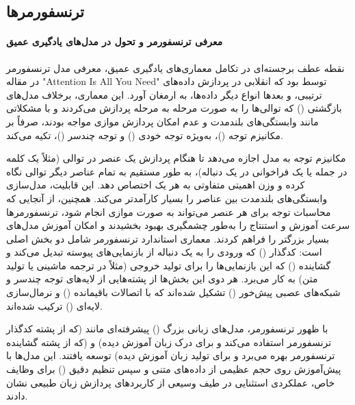 \subsection{ترنسفورمرها}

\paragraph{معرفی ترنسفورمر و تحول در مدل‌های یادگیری عمیق}
نقطه عطف برجسته‌ای در تکامل معماری‌های یادگیری عمیق، معرفی مدل ترنسفورمر در مقاله "Attention Is All You Need" توسط \textcite{attention} بود که انقلابی در پردازش داده‌های ترتیبی، و بعدها انواع دیگر داده‌ها، به ارمغان آورد. این معماری، برخلاف مدل‌های بازگشتی () که توالی‌ها را به صورت مرحله به مرحله پردازش می‌کردند و با مشکلاتی مانند وابستگی‌های بلندمدت و عدم امکان پردازش موازی مواجه بودند، صرفاً بر مکانیزم توجه ()، به‌ویژه توجه خودی () و توجه چندسر ()، تکیه می‌کند.

مکانیزم توجه به مدل اجازه می‌دهد تا هنگام پردازش یک عنصر در توالی (مثلاً یک کلمه در جمله یا یک فراخوانی  در یک دنباله)، به طور مستقیم به تمام عناصر دیگر توالی نگاه کرده و وزن اهمیتی متفاوتی به هر یک اختصاص دهد. این قابلیت، مدل‌سازی وابستگی‌های بلندمدت بین عناصر را بسیار کارآمدتر می‌کند. همچنین، از آنجایی که محاسبات توجه برای هر عنصر می‌تواند به صورت موازی انجام شود، ترنسفورمرها سرعت آموزش و استنتاج را به‌طور چشمگیری بهبود بخشیدند و امکان آموزش مدل‌های بسیار بزرگتر را فراهم کردند. معماری استاندارد ترنسفورمر شامل دو بخش اصلی است: کدگذار () که ورودی را به یک دنباله از بازنمایی‌های پیوسته تبدیل می‌کند و گشاینده () که این بازنمایی‌ها را برای تولید خروجی (مثلاً در ترجمه ماشینی یا تولید متن) به کار می‌برد. هر دوی این بخش‌ها از پشته‌هایی از لایه‌های توجه چندسر و شبکه‌های عصبی پیش‌خور () تشکیل شده‌اند که با اتصالات باقیمانده () و نرمال‌سازی لایه‌ای () ترکیب شده‌اند.

با ظهور ترنسفورمر، مدل‌های زبانی بزرگ () پیشرفته‌ای مانند  \cite{Devlin2019} (که از پشته کدگذار ترنسفورمر استفاده می‌کند و برای درک زبان آموزش دیده) و  \cite{Radford2018, Radford2019, Brown2020} (که از پشته گشاینده ترنسفورمر بهره می‌برد و برای تولید زبان آموزش دیده) توسعه یافتند. این مدل‌ها با پیش‌آموزش روی حجم عظیمی از داده‌های متنی و سپس تنظیم دقیق () برای وظایف خاص، عملکردی استثنایی در طیف وسیعی از کاربردهای پردازش زبان طبیعی نشان دادند.

